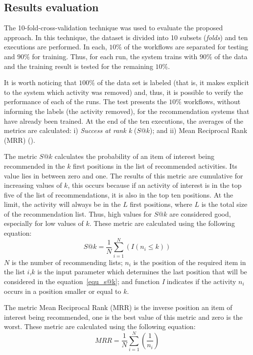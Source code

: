 \documentclass{RITA}
\begin{document}
\subsection{Results evaluation}
The 10-fold-cross-validation technique was used to evaluate the proposed approach. In this technique, the dataset is divided into 10 subsets (\emph{folds}) and ten executions are performed. In each, \(10\%\) of the workflows are separated for testing and \(90\%\) for training. Thus, for each run, the system trains with \(90\%\) of the data and the training result is tested for the remaining \(10\%\).

It is worth noticing that \(100\%\) of the data set is labeled (that is, it makes explicit to the system which activity was removed) and, thus, it is possible to verify the performance of each of the runs. The test presents the \(10\%\) workflows, without informing the labels (the activity removed), for the recommendation systems that have already been trained. At the end of the ten executions, the averages of the metrics are calculated: i) \emph{Success at rank k} (\(S@k\)); and ii) Mean Reciprocal Rank (MRR) (\cite{Harvey2010}).

The metric \(S@k\) calculates the probability of an item of interest being recommended in the \(k\) first positions in the list of recommended activities. Its value lies in between zero and one. The results of this metric are cumulative for increasing values of \(k\), this occurs because if an activity of interest is in the top five of the list of recommendations, it is also in the top ten positions. At the limit, the activity will always be in the \(L\) first positions, where \(L\) is the total size of the recommendation list. Thus, high values for \(S@k\) are considered good, especially for low values of \(k\). These metric are calculated using the following equation:
\begin{equation}
	S@k = \frac{1}{N} \sum\limits_{i=1}^{N} \left( I(n_{i} \leq k) \right)		\label{equ_s@k}
\end{equation}
\(N\) is the number of recommending lists; \(n_{i}\) is the position of the required item in the list \(i\),\(k\)  is the input parameter which determines the last position that will be considered in the equation~\ref{equ_s@k}; and function \emph{I} indicates if the activity \(n_{i}\) occurs in a position smaller or equal to \(k\).

The metric Mean Reciprocal Rank (MRR) is the inverse position an item of interest being recommended, one is the best value of this metric and zero is the worst. These metric are calculated using the following equation:
\begin{equation}
MRR = \frac{1}{N} \sum\limits_{i=1}^{N} \left( \frac{1}{n_{i}} \right) 		\label{equ_mrr}
\end{equation}
\end{document}
